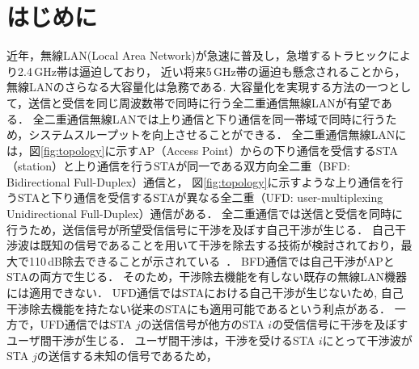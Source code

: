 \documentclass[technicalreport]{ieicej}
\begin{document}

\maketitle

\section{はじめに}
	近年，無線LAN(Local Area Network)が急速に普及し，急増するトラヒックにより2.4\,GHz帯は逼迫しており，
	近い将来5\,GHz帯の逼迫も懸念されることから，無線LANのさらなる大容量化は急務である.
	大容量化を実現する方法の一つとして，送信と受信を同じ周波数帯で同時に行う全二重通信無線LANが有望である．
	全二重通信無線LANでは上り通信と下り通信を同一帯域で同時に行うため，システムスループットを向上させることができる．
	全二重通信無線LANには，図\ref{fig:topology}に示すAP（Access Point）からの下り通信を受信するSTA（station）と上り通信を行うSTAが同一である双方向全二重（BFD: Bidirectional Full-Duplex）通信と，
	図\ref{fig:topology}に示すような上り通信を行うSTAと下り通信を受信するSTAが異なる全二重（UFD: user-multiplexing Unidirectional Full-Duplex）通信がある．
	全二重通信では送信と受信を同時に行うため，送信信号が所望受信信号に干渉を及ぼす自己干渉が生じる．
	自己干渉波は既知の信号であることを用いて干渉を除去する技術が検討されており，最大で110\,dB除去できることが示されている~\cite{fdmac, stanford1}．
	BFD通信では自己干渉がAPとSTAの両方で生じる．
	そのため，干渉除去機能を有しない既存の無線LAN機器には適用できない．
	UFD通信ではSTAにおける自己干渉が生じないため, 自己干渉除去機能を持たない従来のSTAにも適用可能であるという利点がある．
	一方で，UFD通信ではSTA $j$の送信信号が他方のSTA $i$の受信信号に干渉を及ぼすユーザ間干渉が生じる．
	ユーザ間干渉は，干渉を受けるSTA $i$にとって干渉波がSTA $j$の送信する未知の信号であるため，
\end{document}
